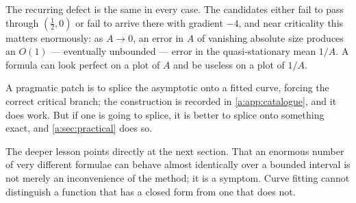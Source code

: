 The recurring defect is the same in every case. The candidates either fail to pass
through $(\tfrac12,0)$ or fail to arrive there with gradient $-4$, and near
criticality this matters enormously: as $A\to0$, an error in $A$ of vanishing
absolute size produces an $O(1)$ --- eventually unbounded --- error in the
quasi-stationary mean $1/A$. A formula can look perfect on a plot of $A$ and be
useless on a plot of $1/A$.

A pragmatic patch is to splice the asymptotic onto a fitted curve, forcing the
correct critical branch; the construction is recorded in \cref{a:app:catalogue},
and it does work. But if one is going to splice, it is better to splice onto
something exact, and \cref{a:sec:practical} does so.

The deeper lesson points directly at the next section. That an enormous number of
very different formulae can behave almost identically over a bounded interval is
not merely an inconvenience of the method; it is a symptom. Curve fitting cannot
distinguish a function that has a closed form from one that does not.
